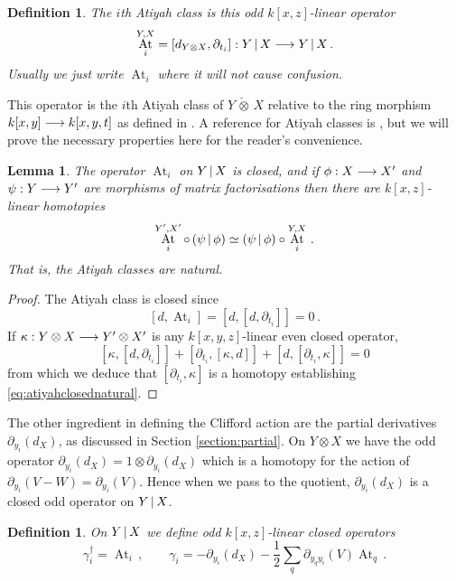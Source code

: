\documentclass[english,letter paper,12pt,leqno]{article}
\newtheorem{lemma}[theorem]{Lemma}
\theoremstyle{example}
\newtheorem{definition}[theorem]{Definition}
\numberwithin{equation}{section}
\def\be{\begin{equation}}
\def\ee{\end{equation}}
\DeclareMathOperator{\At}{At}
\begin{document}
\begin{definition} The $i$th Atiyah class is this odd $k[x,z]$-linear operator
\[
\At^{Y,X}_i = [d_{Y \otimes X}, \partial_{t_i}]: Y \l X \lto Y \l X \,.
\]
Usually we just write $\At_i$ where it will not cause confusion.
\end{definition}

This operator is the $i$th Atiyah class of $Y \,\check{\otimes}\, X$ relative to the ring morphism $k[x,y] \longrightarrow k[x,y,t]$ as defined in \cite[Section 9]{dm1102.2957}. A reference for Atiyah classes is \cite{buchweitz_flenner}, but we will prove the necessary properties here for the reader's convenience.

\begin{lemma}\label{lemma:atiyahclosed} The operator $\At_i$ on $Y \,|\, X$ is closed, and if $\phi: X \longrightarrow X'$ and $\psi: Y \longrightarrow Y'$ are morphisms of matrix factorisations then there are $k[x,z]$-linear homotopies
\be\label{eq:atiyahclosednatural}
\At^{Y',X'}_i \circ \,( \psi \l \phi ) \simeq ( \psi \l \phi ) \circ \At^{Y,X}_i\,.
\ee
That is, the Atiyah classes are \emph{natural}.
\end{lemma}
\begin{proof}
The Atiyah class is closed since
\[
[d, \At_i] = [d, [d, \partial_{t_i}]] = 0\,.
\]
If $\kappa: Y \otimes X \longrightarrow Y' \otimes X'$ is any $k[x,y,z]$-linear even closed operator, 
\[
[ \kappa, [ d, \partial_{t_i} ] ] + [ \partial_{t_i}, [\kappa, d]] + [ d, [ \partial_{t_i}, \kappa] ] = 0
\]
from which we deduce that $[\partial_{t_i}, \kappa]$ is a homotopy establishing \eqref{eq:atiyahclosednatural}.
\end{proof}

The other ingredient in defining the Clifford action are the partial derivatives $\partial_{y_i}(d_X)$, as discussed in Section \ref{section:partial}. On $Y \otimes X$ we have the odd operator $\partial_{y_i}(d_X) = 1 \otimes \partial_{y_i}(d_X)$ which is a homotopy for the action of $\partial_{y_i}(V - W) = \partial_{y_i}(V)$. Hence when we pass to the quotient, $\partial_{y_i}(d_X)$ is a closed odd operator on $Y \,|\, X$.

\begin{definition}\label{defn:cliffordaction_cut} On $Y \,|\, X$ we define odd $k[x,z]$-linear closed operators
\begin{equation}\label{eq:intro_clifford_act1}
\gamma_i^\dagger = \At_i\,, \qquad \gamma_i = - \partial_{y_i}(d_X) - \frac{1}{2} \sum_q \partial_{y_q y_i}(V) \At_{q}\,.
\end{equation}
\end{definition}
\end{document}
